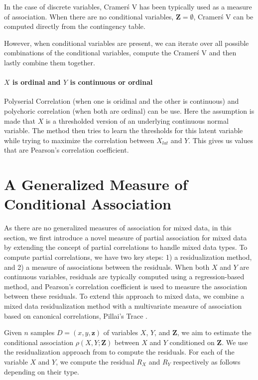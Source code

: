\documentclass{uai2025} %
\begin{document}
In the case of discrete variables, Cramer\'s V has been typically used as a
measure of association. When there are no conditional variables, $ \bm{Z} =
\emptyset $, Cramer\'s V can be computed directly from the contingency table.

However, when conditional variables are present, we can iterate over all
possible combinations of the conditional variables, compute the Cramer\'s V and
then lastly combine them together. 

\paragraph{$ X $ is ordinal and $ Y $ is continuous or ordinal}
Polyserial Correlation (when one is oridinal and the other is continuous) and
polychoric correlation (when both are ordinal) can be use. Here the assumption
is made that $ X $ is a thresholded version of an underlying continuous normal
variable. The method then tries to learn the thresholds for this latent
variable while trying to maximize the correlation between $ X_{lat} $ and $ Y
$. This gives us values that are Pearson's correlation coefficient.

\section{A Generalized Measure of Conditional Association}
\label{sec:mixed_association}

As there are no generalized measures of association for mixed data, in this
section, we first introduce a novel measure of partial association for mixed
data by extending the concept of partial correlations \citep{Whittaker2009}
 to handle mixed data types. To compute partial
correlations, we have two key steps: 1) a residualization method, and 2) a
measure of associations between the residuals. When both $ X $ and $ Y $ are
continuous variables, residuals are typically computed using a regression-based
method, and Pearson's correlation coefficient is used to measure the
association between these residuals. To extend this approach to mixed data, we
combine a mixed data residualization method \citep{Ankan2023} with a
multivariate measure of association based on canonical correlations, Pillai's
Trace \citep{Pillai1955}. 

Given $ n $ samples $ D = (x, y, \bm{z}) $ of variables $ X $, $ Y $, and $
\bm{Z} $, we aim to estimate the conditional association $ \rho(X, Y; \bm{Z}) $
between $ X $ and $ Y $ conditioned on $ \bm{Z} $. We use the residualization
approach from \citet{Ankan2023} to compute the residuals. For each of the
variable $ X $ and $ Y $, we compute the residual $ R_X $ and $R_Y$
respectively as follows depending on their type.
\end{document}
